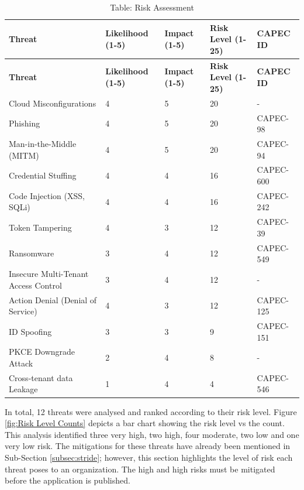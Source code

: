 \begin{longtable}{|p{4cm}|p{2cm}|p{2cm}|p{2cm}|p{3cm}|}
\caption{Table: Risk Assessment}
\label{table:risk_assessment}
\hline
\rowcolor{grey!15}
\textbf{Threat} & \textbf{Likelihood (1-5)} & \textbf{Impact (1-5)} & \textbf{Risk Level (1-25)} & \textbf{CAPEC ID}\\
\hline
\endfirsthead

\hline
\rowcolor{grey!15}
\textbf{Threat} & \textbf{Likelihood (1-5)} & \textbf{Impact (1-5)} & \textbf{Risk Level (1-25)} & \textbf{CAPEC ID}\\
\hline
\endhead

\hline
\endfoot

\hline
\endlastfoot
Cloud Misconfigurations & 4 & 5 & \cellcolor{red!90} 20 & - \\
\hline
Phishing & 4 & 5 & \cellcolor{red!90} 20 & CAPEC-98  \\
\hline
Man-in-the-Middle (MITM) & 4 & 5 & \cellcolor{red!90} 20 &  CAPEC-94\\
\hline
Credential Stuffing & 4 & 4 & \cellcolor{red!60} 16 & CAPEC-600 \\
\hline
Code Injection (XSS, SQLi) & 4 & 4 & \cellcolor{red!60} 16 & CAPEC-242 \\
\hline
Token Tampering & 4 & 3 &  \cellcolor{yellow!90} 12 &CAPEC-39 \\
\hline
Ransomware & 3 & 4 &  \cellcolor{yellow!90} 12 & CAPEC-549 \\
\hline
Insecure Multi-Tenant Access Control & 3 & 4 &  \cellcolor{yellow!90} 12 & - \\
\hline
Action Denial (Denial of Service) & 4 & 3 &  \cellcolor{yellow!90} 12 & CAPEC-125\\
\hline
ID Spoofing & 3 & 3 &  \cellcolor{green!20} 9 & CAPEC-151\\
\hline

PKCE Downgrade Attack & 2 & 4 & \cellcolor{green!20} 8 & -\\
\hline
Cross-tenant data Leakage & 1 & 4 &  \cellcolor{ForestGreen} 4 & CAPEC-546 \\
\hline

\end{longtable}
 In total, 12 threats were analysed and ranked according to their risk level. Figure \ref{fig:Risk Level Counts} depicts a bar chart showing the risk level vs the count. This analysis identified three very high, two high, four moderate, two low and one very low risk. The mitigations for these threats have already been mentioned in Sub-Section \ref{subsec:stride}; however, this section highlights the level of risk each threat poses to an organization. The high and high risks must be mitigated before the application is published. 

